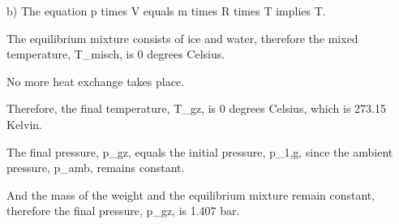 b) The equation p times V equals m times R times T implies T.

The equilibrium mixture consists of ice and water, therefore the mixed temperature, T_misch, is 0 degrees Celsius.

No more heat exchange takes place.

Therefore, the final temperature, T_gz, is 0 degrees Celsius, which is 273.15 Kelvin.

The final pressure, p_gz, equals the initial pressure, p_1,g, since the ambient pressure, p_amb, remains constant.

And the mass of the weight and the equilibrium mixture remain constant, therefore the final pressure, p_gz, is 1.407 bar.